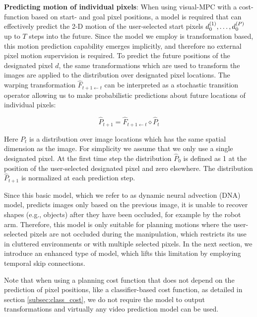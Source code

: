 \textbf{Predicting motion of individual pixels}: 
When using visual-MPC with a cost-function based on start- and goal pixel positions, a model is required that can effectively predict the 2-D motion of the user-selected start pixels $d_0^{(1)}, \dots, d_0^{(P)}$ up to $T$ steps into the future. Since the model we employ is transformation based, this motion prediction capability emerges implicitly, and therefore no external pixel motion supervision is required. To predict the future positions of the designated pixel $d$, the same transformations which are used to transform the images are applied to the distribution over designated pixel locations. The warping transformation $\hat{F}_{t+1 \leftarrow t}$ can be interpreted as a stochastic transition operator allowing us to make probabilistic predictions about future locations of individual pixels:

\begin{equation}
\hat{P}_{t+1} = \hat{F}_{t+1 \leftarrow t} \diamond  \hat{P}_t
\label{eqn:prob_forward}
\end{equation}

Here $P_t$ is a distribution over image locations which has the same spatial dimension as the image. For simplicity we assume that we only use a single designated pixel. At the first time step the distribution $\hat{P}_0$ is defined as 1 at the position of the user-selected designated pixel and zero elsewhere. The distribution $\hat{P}_{t+1}$ is normalized at each prediction step.

Since this basic model, which we refer to as dynamic neural advection (DNA) model, predicts images only based on the previous image, it is unable to recover shapes (e.g., objects) after they have been occluded, for example by the robot arm. Therefore, this model is only suitable for planning motions where the user-selected pixels are not occluded during the manipulation, which restricts its use in cluttered environments or with multiple selected pixels. In the next section, we introduce an enhanced type of model, which lifts this limitation by employing temporal skip connections.

Note that when using a planning cost function that does not depend on the prediction of pixel positions, like a classifier-based cost function, as detailed in section \ref{subsec:class_cost}, we do not require the model to output transformations and virtually any video prediction model can be used. 

